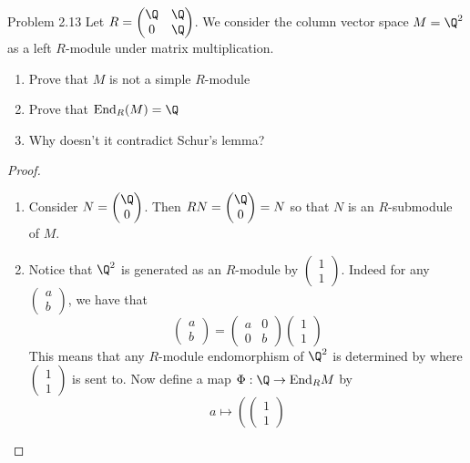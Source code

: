 \documentclass[a4paper]{article}
\begin{document}
\begin{ex}{Problem 2.13}{} Let $R=\begin{pmatrix}
\Q & \Q\\
0 & \Q
\end{pmatrix}$. We consider the column vector space $M=\Q^2$ as a left $R$-module
under matrix multiplication. 
\begin{enumerate}
\item Prove that $M$ is not a simple $R$-module
\item Prove that $\text{End}_R(M)=\Q$
\item Why doesn't it contradict Schur's lemma?
\end{enumerate} 
\begin{proof}~\\
\begin{enumerate}
\item Consider $N=\begin{pmatrix}
\Q\\0
\end{pmatrix}$. Then $RN=\begin{pmatrix}
\Q\\0
\end{pmatrix}=N$ so that $N$ is an $R$-submodule of $M$. 
\item Notice that $\Q^2$ is generated as an $R$-module by $\begin{pmatrix}
1\\1
\end{pmatrix}$. Indeed for any $\begin{pmatrix}
a\\b
\end{pmatrix}$, we have that $$\begin{pmatrix}
a\\b
\end{pmatrix}=\begin{pmatrix}
a & 0\\
0 & b
\end{pmatrix}\begin{pmatrix}
1\\1
\end{pmatrix}$$ This means that any $R$-module endomorphism of $\Q^2$ is determined by where $\begin{pmatrix}
1\\1
\end{pmatrix}$
is sent to. Now define a map $\Phi:\Q\to\text{End}_RM$ by $$a\mapsto\left(\begin{pmatrix}
1\\1

\end{pmatrix}$$
\end{enumerate}
\end{proof}
\end{ex}
\end{document}
